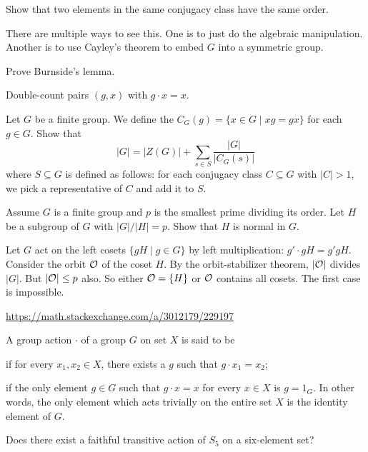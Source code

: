 \begin{problem}
	Show that two elements in the same conjugacy class
	have the same order.
	\begin{hint}
		There are multiple ways to see this.
		One is to just do the algebraic manipulation.
		Another is to use Cayley's theorem to embed $G$ into a symmetric group.
	\end{hint}
\end{problem}

\begin{problem}
	\gim
	Prove Burnside's lemma.
	\begin{hint}
		Double-count pairs $(g,x)$ with $g \cdot x = x$.
	\end{hint}
\end{problem}

\begin{sproblem}
	\label{prob:class_eq}
	Let $G$ be a finite group.
	We define the  $C_G(g) = \{ x \in G \mid xg = gx \}$
	for each $g \in G$.
	Show that
	\[ \left\lvert G \right\rvert = \left\lvert Z(G) \right\rvert + \sum_{s \in S}
	\frac{\left\lvert G \right\rvert}{\left\lvert C_G(s) \right\rvert} \]
	where $S \subseteq G$ is defined as follows:
	for each conjugacy class $C \subseteq G$ with $|C| > 1$,
	we pick a representative of $C$ and add it to $S$.
\end{sproblem}

\begin{dproblem}
	[Classical]
	\gim
	Assume $G$ is a finite group and $p$ is the smallest prime dividing its order.
	Let $H$ be a subgroup of $G$ with $\left\lvert G \right\rvert / \left\lvert H \right\rvert = p$.
	Show that $H$ is normal in $G$.
	\begin{hint}
		Let $G$ act on the left cosets $\{gH \mid g \in G\}$
		by left multiplication: $g' \cdot gH = g'gH$.
		Consider the orbit $\mathcal O$ of the coset $H$.
		By the orbit-stabilizer theorem, $\left\lvert \mathcal O \right\rvert$ divides $\left\lvert G \right\rvert$.
		But $\left\lvert \mathcal O \right\rvert \le p$ also.
		So either $\mathcal O = \{H\}$ or $\mathcal O$ contains all cosets.
		The first case is impossible.
	\end{hint}
	\begin{sol}
		\url{https://math.stackexchange.com/a/3012179/229197}
	\end{sol}
\end{dproblem}

\begin{problem}
	A group action $\cdot$ of a group $G$ on set $X$ is said to be
	\begin{itemize}
		\ii {} if for every $x_1, x_2 \in X$,
		there exists a $g$ such that $g \cdot x_1 = x_2$;

		\ii {} if the only element $g \in G$
		such that $g \cdot x = x$ for every $x \in X$ is $g = 1_G$.
		In other words, the only element which acts trivially on the entire set $X$
		is the identity element of $G$.
	\end{itemize}
	Does there exist a faithful transitive action of  $S_5$ on a six-element set?
\end{problem}
